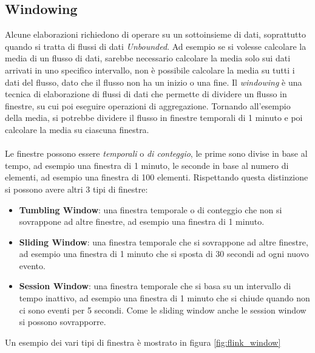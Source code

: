 
\subsection{Windowing}
\label{subsec:flink_windowing}
Alcune elaborazioni richiedono di operare su un sottoinsieme di dati, soprattutto quando si tratta di flussi di dati \textit{Unbounded}.
Ad esempio se si volesse calcolare la media di un flusso di dati, sarebbe necessario calcolare la media solo sui dati arrivati in uno specifico intervallo, 
non è possibile calcolare la media su tutti i dati del flusso, dato che il flusso non ha un inizio o una fine.
Il \textit{windowing} è una tecnica di elaborazione di flussi di dati che permette di dividere un flusso in finestre, su cui poi eseguire operazioni di aggregazione.
Tornando all'esempio della media, si potrebbe dividere il flusso in finestre temporali di 1 minuto e poi calcolare la media su ciascuna finestra.\\\\
Le finestre possono essere \textit{temporali} o \textit{di conteggio}, le prime sono divise in base al tempo, ad esempio una finestra di 1 minuto,
le seconde in base al numero di elementi, ad esempio una finestra di 100 elementi.
Rispettando questa distinzione si possono avere altri 3 tipi di finestre:
\begin{itemize}
    \item \textbf{Tumbling Window}: una finestra temporale o di conteggio che non si sovrappone ad altre finestre, ad esempio una finestra di 1 minuto.
    \item \textbf{Sliding Window}: una finestra temporale che si sovrappone ad altre finestre, ad esempio una finestra di 1 minuto che si sposta di 30 secondi ad ogni nuovo evento.
    \item \textbf{Session Window}: una finestra temporale che si basa su un intervallo di tempo inattivo, ad esempio una finestra di 1 minuto che si chiude quando non ci sono eventi per 5 secondi.
    Come le sliding window anche le session window si possono sovrapporre.
\end{itemize}
Un esempio dei vari tipi di finestra è mostrato in figura \ref{fig:flink_window}


